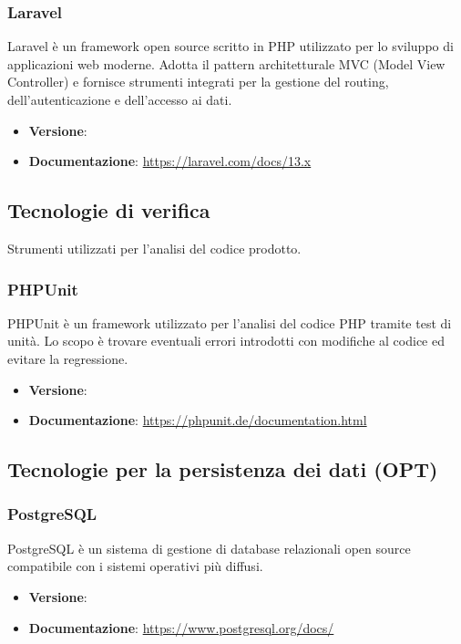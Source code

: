 \documentclass[a4paper,10pt]{article}
\begin{document}
\subsubsection{Laravel}
Laravel è un framework open source scritto in PHP utilizzato per lo sviluppo di applicazioni web moderne. Adotta il pattern architetturale MVC (Model View Controller) e fornisce strumenti integrati per la gestione del routing, dell’autenticazione e dell’accesso ai dati.
\begin{itemize}
    \item \textbf{Versione}:
    \item \textbf{Documentazione}: \url{https://laravel.com/docs/13.x}
\end{itemize}


\subsection{Tecnologie di verifica}
Strumenti utilizzati per l'analisi del codice prodotto.

\subsubsection{PHPUnit}
PHPUnit è un framework utilizzato per l'analisi del codice PHP tramite test di unità. Lo scopo è trovare eventuali errori introdotti con modifiche al codice ed evitare la regressione.
\begin{itemize}
    \item \textbf{Versione}:
    \item \textbf{Documentazione}: \url{https://phpunit.de/documentation.html}
\end{itemize}

\subsection{Tecnologie per la persistenza dei dati (OPT)}

\subsubsection{PostgreSQL}
PostgreSQL è un sistema di gestione di database relazionali open source compatibile con i sistemi operativi più diffusi.
\begin{itemize}
    \item \textbf{Versione}:
    \item \textbf{Documentazione}: \url{https://www.postgresql.org/docs/}
\end{itemize}
\end{document}
